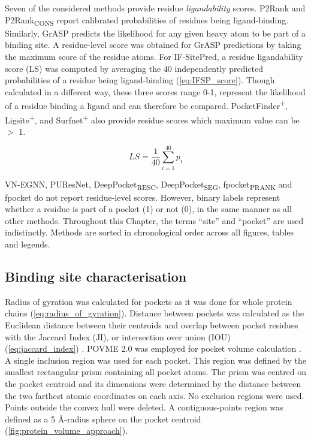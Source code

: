 Seven of the considered methods provide residue \textit{ligandability} scores. P2Rank and P2Rank\textsubscript{CONS} report calibrated probabilities of residues being ligand-binding. Similarly, GrASP predicts the likelihood for any given heavy atom to be part of a binding site. A residue-level score was obtained for GrASP predictions by taking the maximum score of the residue atoms. For IF-SitePred, a residue ligandability score (LS) was computed by averaging the 40 independently predicted probabilities of a residue being ligand-binding (\autoref{eq:IFSP_score}). Though calculated in a different way, these three scores range 0-1, represent the likelihood of a residue binding a ligand and can therefore be compared. PocketFinder\textsuperscript{+}, Ligsite\textsuperscript{+}, and Surfnet\textsuperscript{+} also provide residue scores which maximum value can be $>$ 1.

\begin{equation}
LS = \frac{1}{40} \sum_{i=1}^{40} p_i
\label{eq:IFSP_score}
\end{equation}

VN-EGNN, PUResNet, DeepPocket\textsubscript{RESC}, DeepPocket\textsubscript{SEG}, fpocket\textsubscript{PRANK} and fpocket do not report residue-level scores. However, binary labels represent whether a residue is part of a pocket (1) or not (0), in the same manner as all other methods. Throughout this Chapter, the terms ``site'' and ``pocket'' are used indistinctly. Methods are sorted in chronological order across all figures, tables and legends.

\subsection{Binding site characterisation}

Radius of gyration was calculated for pockets as it was done for whole protein chains (\autoref{eq:radius_of_gyration}). Distance between pockets was calculated as the Euclidean distance between their centroids and overlap between pocket residues with the Jaccard Index (JI), or intersection over union (IOU) (\autoref{eq:jaccard_index}) \cite{JACCARD_1901_INDEX, JACCARD_1912_INDEX}. POVME 2.0 was employed for pocket volume calculation \cite{DURRANT_2011_POVME, DURRANT_2014_POVME2, WAGNER_2017_POVME3}. A single inclusion region was used for each pocket. This region was defined by the smallest rectangular prism containing all pocket atoms. The prism was centred on the pocket centroid and its dimensions were determined by the distance between the two farthest atomic coordinates on each axis. No exclusion regions were used. Points outside the convex hull were deleted. A contiguous-points region was defined as a 5 \AA{}-radius sphere on the pocket centroid (\autoref{fig:protein_volume_approach}).

